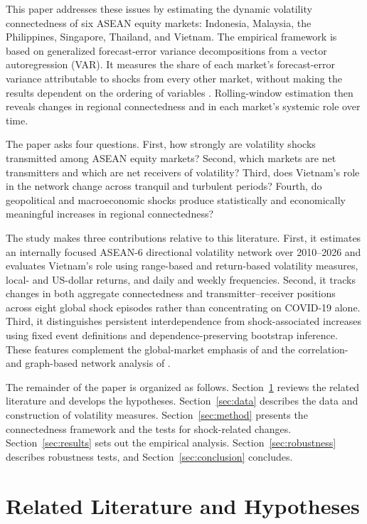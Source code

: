 \documentclass[12pt,a4paper]{article}
\begin{document}
This paper addresses these issues by estimating the dynamic volatility connectedness of six ASEAN equity markets: Indonesia, Malaysia, the Philippines, Singapore, Thailand, and Vietnam. The empirical framework is based on generalized forecast-error variance decompositions from a vector autoregression (VAR). It measures the share of each market's forecast-error variance attributable to shocks from every other market, without making the results dependent on the ordering of variables \citep{PesaranShin1998,DieboldYilmaz2012}. Rolling-window estimation then reveals changes in regional connectedness and in each market's systemic role over time.

The paper asks four questions. First, how strongly are volatility shocks transmitted among ASEAN equity markets? Second, which markets are net transmitters and which are net receivers of volatility? Third, does Vietnam's role in the network change across tranquil and turbulent periods? Fourth, do geopolitical and macroeconomic shocks produce statistically and economically meaningful increases in regional connectedness?

The study makes three contributions relative to this literature. First, it estimates an internally focused ASEAN-6 directional volatility network over 2010--2026 and evaluates Vietnam's role using range-based and return-based volatility measures, local- and US-dollar returns, and daily and weekly frequencies. Second, it tracks changes in both aggregate connectedness and transmitter--receiver positions across eight global shock episodes rather than concentrating on COVID-19 alone. Third, it distinguishes persistent interdependence from shock-associated increases using fixed event definitions and dependence-preserving bootstrap inference. These features complement the global-market emphasis of \citet{SethapramoteEtAl2023} and the correlation- and graph-based network analysis of \citet{AlAnshari2025}.

The remainder of the paper is organized as follows. Section~\ref{sec:literature} reviews the related literature and develops the hypotheses. Section~\ref{sec:data} describes the data and construction of volatility measures. Section~\ref{sec:method} presents the connectedness framework and the tests for shock-related changes. Section~\ref{sec:results} sets out the empirical analysis. Section~\ref{sec:robustness} describes robustness tests, and Section~\ref{sec:conclusion} concludes.

\section{Related Literature and Hypotheses}
\label{sec:literature}
\end{document}
